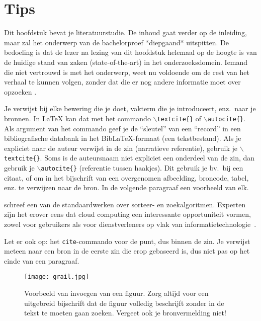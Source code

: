 \section{Tips}

Dit hoofdstuk bevat je literatuurstudie. De inhoud gaat verder op de inleiding, maar zal het onderwerp van de bachelorproef *diepgaand* uitspitten. De bedoeling is dat de lezer na lezing van dit hoofdstuk helemaal op de hoogte is van de huidige stand van zaken (state-of-the-art) in het onderzoeksdomein. Iemand die niet vertrouwd is met het onderwerp, weet nu voldoende om de rest van het verhaal te kunnen volgen, zonder dat die er nog andere informatie moet over opzoeken \autocite{Pollefliet2011}.

Je verwijst bij elke bewering die je doet, vakterm die je introduceert, enz.\ naar je bronnen. In \LaTeX{} kan dat met het commando \texttt{$\backslash${textcite\{\}}} of \texttt{$\backslash${autocite\{\}}}. Als argument van het commando geef je de ``sleutel'' van een ``record'' in een bibliografische databank in het Bib\LaTeX{}-formaat (een tekstbestand). Als je expliciet naar de auteur verwijst in de zin (narratieve referentie), gebruik je \texttt{$\backslash${}textcite\{\}}. Soms is de auteursnaam niet expliciet een onderdeel van de zin, dan gebruik je \texttt{$\backslash${}autocite\{\}} (referentie tussen haakjes). Dit gebruik je bv.~bij een citaat, of om in het bijschrift van een overgenomen afbeelding, broncode, tabel, enz. te verwijzen naar de bron. In de volgende paragraaf een voorbeeld van elk.

\textcite{Knuth1998} schreef een van de standaardwerken over sorteer- en zoekalgoritmen. Experten zijn het erover eens dat cloud computing een interessante opportuniteit vormen, zowel voor gebruikers als voor dienstverleners op vlak van informatietechnologie~\autocite{Creeger2009}.

Let er ook op: het \texttt{cite}-commando voor de punt, dus binnen de zin. Je verwijst meteen naar een bron in de eerste zin die erop gebaseerd is, dus niet pas op het einde van een paragraaf.

\begin{figure}
    \centering
    \texttt{[image: grail.jpg]}
    \caption[Voorbeeld figuur.]{\label{fig:grail}Voorbeeld van invoegen van een figuur. Zorg altijd voor een uitgebreid bijschrift dat de figuur volledig beschrijft zonder in de tekst te moeten gaan zoeken. Vergeet ook je bronvermelding niet!}
\end{figure}